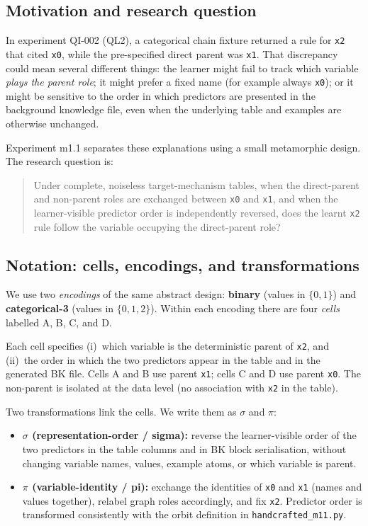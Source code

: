 \documentclass[11pt,a4paper]{article}
\begin{document}
\subsection{Motivation and research question}

In experiment QI-002 (QL2), a categorical chain fixture returned a rule for \texttt{x2} that cited
\texttt{x0}, while the pre-specified direct parent was \texttt{x1}. That discrepancy could mean
several different things: the learner might fail to track which variable \emph{plays the parent
role}; it might prefer a fixed name (for example always \texttt{x0}); or it might be sensitive to
the order in which predictors are presented in the background knowledge file, even when the
underlying table and examples are otherwise unchanged.

Experiment m1.1 separates these explanations using a small metamorphic design. The research
question is:

\begin{quote}
Under complete, noiseless target-mechanism tables, when the direct-parent and non-parent roles
are exchanged between \texttt{x0} and \texttt{x1}, and when the learner-visible predictor order
is independently reversed, does the learnt \texttt{x2} rule follow the variable occupying the
direct-parent role?
\end{quote}

\subsection{Notation: cells, encodings, and transformations}

We use two \emph{encodings} of the same abstract design: \textbf{binary} (values in \(\{0,1\}\))
and \textbf{categorical-3} (values in \(\{0,1,2\}\)). Within each encoding there are four
\emph{cells} labelled A, B, C, and D.

Each cell specifies (i)~which variable is the deterministic parent of \texttt{x2}, and (ii)~the
order in which the two predictors appear in the table and in the generated BK file. Cells A and
B use parent \texttt{x1}; cells C and D use parent \texttt{x0}. The non-parent is isolated at the
data level (no association with \texttt{x2} in the table).

Two transformations link the cells. We write them as $\sigma$ and $\pi$:

\begin{itemize}
  \item \textbf{$\sigma$ (representation-order / sigma):} reverse the learner-visible order of
  the two predictors in the table columns and in BK block serialisation, without changing
  variable names, values, example atoms, or which variable is parent.
  \item \textbf{$\pi$ (variable-identity / pi):} exchange the identities of \texttt{x0} and
  \texttt{x1} (names and values together), relabel graph roles accordingly, and fix \texttt{x2}.
  Predictor order is transformed consistently with the orbit definition in
  \texttt{handcrafted\_m11.py}.
\end{itemize}
\end{document}
